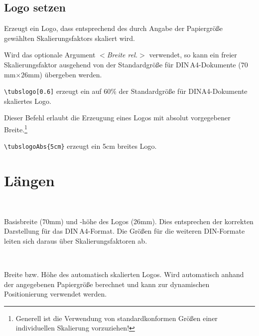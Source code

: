 \subsection{Logo setzen}\label{options:papersize}

\begin{Declaration}
\end{Declaration}\label{cmd:tubslogo}

Erzeugt ein Logo, dass entsprechend des durch Angabe der Papiergröße
gewählten Skalierungsfaktors skaliert wird.

Wird das optionale Argument {\sffamily\itshape $<$Breite rel.$>$}
verwendet, so kann ein freier Skalierungsfaktor ausgehend von der
Standardgröße für \mbox{DIN\,A4}-Dokumente ($70$mm$\times 26$mm) übergeben werden.

\begin{example}
\lstinline!\tubslogo[0.6]! erzeugt ein auf 60\% der 
Standardgröße für DINA4-Dokumente skaliertes Logo.
\end{example}


\begin{Declaration}
\end{Declaration}\label{cmd:tubslogo}
Dieser Befehl erlaubt die Erzeugung eines Logos mit absolut vorgegebener
Breite.\footnote{Generell ist die Verwendung von standardkonformen Größen
einer individuellen Skalierung vorzuziehen!}

\begin{example}
  \lstinline!\tubslogoAbs{5cm}! erzeugt ein 5cm breites Logo.
\end{example}


\section{Längen}

\begin{Declaration}
  \\
\end{Declaration}
Basisbreite (70mm) und -höhe des Logos (26mm).
Dies entsprechen der korrekten Darstellung für das \mbox{DIN\,A4}-Format.
Die Größen für die weiteren DIN-Formate leiten sich daraus über
Skalierungsfaktoren ab.

\begin{Declaration}
  \\
\end{Declaration}
Breite bzw. Höhe des automatisch skalierten Logos.
Wird automatisch anhand der angegebenen Papiergröße berechnet und
kann zur dynamischen Positionierung verwendet werden.
